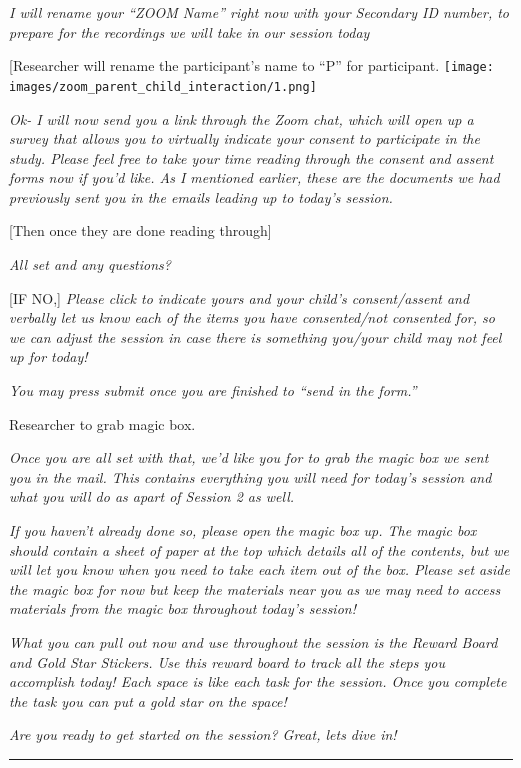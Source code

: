 \documentclass[
]{book}
\begin{document}
\emph{I will rename your ``ZOOM Name'' right now with your Secondary ID number, to prepare for the recordings we will take in our session today}

{[}Researcher will rename the participant's name to ``P'' for participant. \texttt{[image: images/zoom\_parent\_child\_interaction/1.png]}

\emph{Ok- I will now send you a link through the Zoom chat, which will open up a survey that allows you to virtually indicate your consent to participate in the study. Please feel free to take your time reading through the consent and assent forms now if you'd like. As I mentioned earlier, these are the documents we had previously sent you in the emails leading up to today's session.}

{[}Then once they are done reading through{]}

\emph{All set and any questions?}

{[}IF NO,{]} \emph{Please click to indicate yours and your child's consent/assent and verbally let us know each of the items you have consented/not consented for, so we can adjust the session in case there is something you/your child may not feel up for today!}

\emph{You may press submit once you are finished to ``send in the form.''}

Researcher to grab magic box.

\emph{Once you are all set with that, we'd like you for to grab the magic box we sent you in the mail. This contains everything you will need for today's session and what you will do as apart of Session 2 as well.}

\emph{If you haven't already done so, please open the magic box up. The magic box should contain a sheet of paper at the top which details all of the contents, but we will let you know when you need to take each item out of the box. Please set aside the magic box for now but keep the materials near you as we may need to access materials from the magic box throughout today's session!}

\emph{What you can pull out now and use throughout the session is the Reward Board and Gold Star Stickers. Use this reward board to track all the steps you accomplish today! Each space is like each task for the session. Once you complete the task you can put a gold star on the space!}

\emph{Are you ready to get started on the session? Great, lets dive in!}

\begin{center}\rule{0.5\linewidth}{0.5pt}\end{center}
\end{document}
